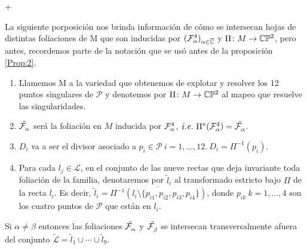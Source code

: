 +%

La siguiente porposición nos brinda información de cómo se intersecan hojas de distintas foliaciones de M que son inducidas por $(\Fol[4]{\alpha})_{\alpha\in\overline\C}$ y $\Pi\colon M\rightarrow\CP$, pero antes, recordemos parte de la notación que se usó antes de la proposición \ref{Prop:2}.

\begin{enumerate}


\item Llamemos M a la variedad que obtenemos de explotar y resolver los 12 puntos singulares de $\mathcal{P}$ y denotemos por $\Pi\colon M \rightarrow \CP$ al mapeo que resuelve las singularidades.

\item $\tilde{\Fol{\alpha}}$ será la foliación en $M$ inducida por $\Fol[4]{\alpha}$,  $\mathit{i.e.} \ \Pi^{*}(\Fol[4]{\alpha}) = \tilde{\Fol{\alpha}}$.

\item $D_{i}$ va a ser el divisor asociado a $p_{i} \in \mathcal{P} \ i=1,...,12. \ D_{i} = \Pi^{-1}(p_{i})$.

\item Para cada $l_{j} \in \mathcal{L}$, en el conjunto de las nueve rectas que deja invariante toda foliación de la familia,  denotaremos por $\tilde{l}_{i}$ al transformado estricto bajo $\Pi$ de la recta $l_{i}$. Es decir, $\tilde{l}_{i}= \overline{\Pi^{-1}(l_{i} \setminus \{p_{i1}, p_{i2}, p_{i3}, p_{i4} \})}$, donde $p_{ik} \ k=1,...,4$ son los cuatro puntos de $\mathcal{P}$ que están en $l_{i}$.

\end{enumerate}


\begin{Proposicion}
\label{Prop:Transversalidad}
Si $\alpha\neq\beta$ entonces las foliaciones $\tilde{\Fol{\alpha}}$ y $\tilde{\Fol{\beta}}$ se intersecan transversalmente afuera del conjunto $\tilde{\mathcal{L}} = \tilde{l}_{1}\cup\cdots\cup\tilde{l}_{9}$.
\end{Proposicion}

